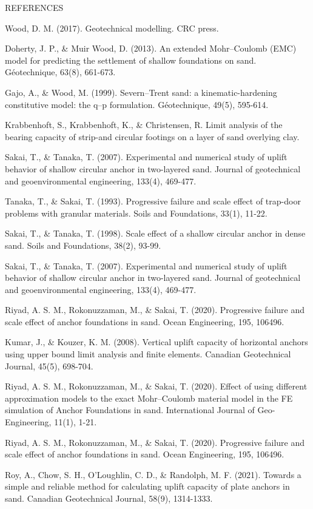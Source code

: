 \documentclass[a4paper, nobind]{templates/ociamthesis}
\newcommand*{\bibtitle}{Works Cited}
\begin{document}
REFERENCES

Wood, D. M. (2017). Geotechnical modelling. CRC press.

Doherty, J. P., \& Muir Wood, D. (2013). An extended Mohr--Coulomb (EMC) model for predicting the settlement of shallow foundations on sand. Géotechnique, 63(8), 661-673.

Gajo, A., \& Wood, M. (1999). Severn--Trent sand: a kinematic-hardening constitutive model: the q--p formulation. Géotechnique, 49(5), 595-614.

Krabbenhoft, S., Krabbenhoft, K., \& Christensen, R. Limit analysis of the bearing capacity of strip-and circular footings on a layer of sand overlying clay.

Sakai, T., \& Tanaka, T. (2007). Experimental and numerical study of uplift behavior of shallow circular anchor in two-layered sand. Journal of geotechnical and geoenvironmental engineering, 133(4), 469-477.

Tanaka, T., \& Sakai, T. (1993). Progressive failure and scale effect of trap-door problems with granular materials. Soils and Foundations, 33(1), 11-22.

Sakai, T., \& Tanaka, T. (1998). Scale effect of a shallow circular anchor in dense sand. Soils and Foundations, 38(2), 93-99.

Sakai, T., \& Tanaka, T. (2007). Experimental and numerical study of uplift behavior of shallow circular anchor in two-layered sand. Journal of geotechnical and geoenvironmental engineering, 133(4), 469-477.

Riyad, A. S. M., Rokonuzzaman, M., \& Sakai, T. (2020). Progressive failure and scale effect of anchor foundations in sand. Ocean Engineering, 195, 106496.

Kumar, J., \& Kouzer, K. M. (2008). Vertical uplift capacity of horizontal anchors using upper bound limit analysis and finite elements. Canadian Geotechnical Journal, 45(5), 698-704.

Riyad, A. S. M., Rokonuzzaman, M., \& Sakai, T. (2020). Effect of using different approximation models to the exact Mohr--Coulomb material model in the FE simulation of Anchor Foundations in sand. International Journal of Geo-Engineering, 11(1), 1-21.

Riyad, A. S. M., Rokonuzzaman, M., \& Sakai, T. (2020). Progressive failure and scale effect of anchor foundations in sand. Ocean Engineering, 195, 106496.

Roy, A., Chow, S. H., O'Loughlin, C. D., \& Randolph, M. F. (2021). Towards a simple and reliable method for calculating uplift capacity of plate anchors in sand. Canadian Geotechnical Journal, 58(9), 1314-1333.


\setlength{\baselineskip}{0pt} %

{\renewcommand*\MakeUppercase[1]{#1}%
\printbibliography[heading=bibintoc,title={\bibtitle}]}
\end{document}
